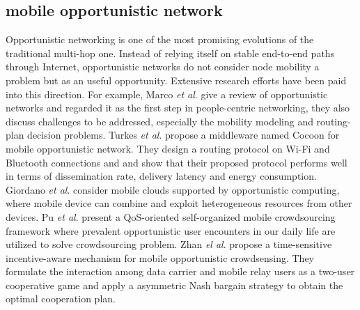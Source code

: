 \documentclass[journal]{IEEEtran}
\begin{document}
\subsection{mobile opportunistic network}
Opportunistic networking is one of the most promising evolutions of the traditional multi-hop one. 
Instead of relying itself on stable end-to-end paths through Internet, opportunistic networks do not consider node mobility a problem but as an useful opportunity. 
Extensive research efforts have been paid into this direction. For example, Marco \emph{et al}. \cite{Conti2014} give a review of opportunistic networks and regarded it as the first step in people-centric networking, they also discuss challenges to be addressed, especially the mobility modeling and routing-plan decision problems.
Turkes \emph{et al}. \cite{turkes2016cocoon} propose a middleware named Cocoon for mobile opportunistic network. They design a routing protocol on Wi-Fi and Bluetooth connections and and show that their proposed protocol performs well in terms of dissemination rate, delivery latency and energy consumption.
Giordano \emph{et al}. \cite{giordano2011human} consider mobile clouds supported by opportunistic computing, where mobile device can combine and exploit heterogeneous resources from other devices.
Pu \emph{et al}. \cite{Pu2017crowd} present a QoS-oriented self-organized mobile crowdsourcing framework where prevalent opportunistic user encounters in our daily life are utilized to solve crowdsourcing problem.
Zhan \emph{el al}. \cite{zhan2017time} propose a time-sensitive incentive-aware mechanism for mobile opportunistic crowdsensing. They formulate the interaction among data carrier and mobile relay users as a two-user cooperative game and apply a asymmetric Nash bargain strategy to obtain the optimal cooperation plan.
\end{document}
